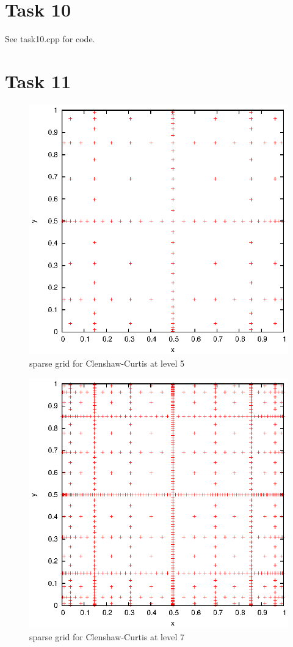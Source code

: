 \documentclass[]{article}
\begin{document}
\section*{Task 10}
See task10.cpp for code.

\section*{Task 11}
\begin{figure}[!ht]
\centering
\includegraphics[width=.9\textwidth]{task11_cc5}
\caption{sparse grid for Clenshaw-Curtis at level 5}
\label{fig:Task11a}
\end{figure}

\begin{figure}[!ht]
\centering
\includegraphics[width=.9\textwidth]{task11_cc7}
\caption{sparse grid for Clenshaw-Curtis at level 7}
\label{fig:Task11b}
\end{figure}
\end{document}
